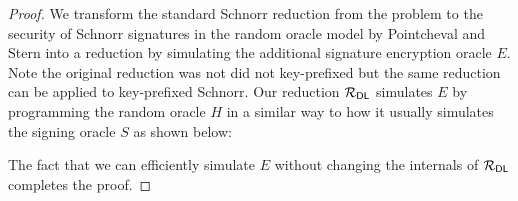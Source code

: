 \begin{proof}
  We transform the standard Schnorr reduction from the \DLOG problem to the \EUFCMA security of Schnorr signatures in the random oracle model by Pointcheval and Stern\cite{pointcheval2000security} into a \EUFCMAVES reduction by simulating the additional signature encryption oracle $E$.
  Note the original reduction was not did not key-prefixed but the same reduction can be applied to key-prefixed Schnorr. Our reduction $\mathcal{R}_{\textsf{DL}}$ simulates $E$ by programming the random oracle $H$ in a similar way to how it usually simulates the signing oracle $S$ as shown below:

\begin{center}
  \end{center}

The fact that we can efficiently simulate $E$ without changing the internals of $\mathcal{R}_{\textsf{DL}}$ completes the proof.
\end{proof}
